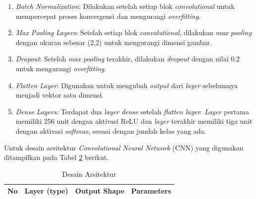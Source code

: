 \begin{table}[H]
\begin{enumerate}
        \item  \textit{Batch Normalization}: Dilakukan setelah setiap blok \textit{convolutional }untuk mempercepat proses konvergensi dan mengurangi \textit{overfitting}.
    
        \item \textit{Max Pooling Layers}: Setelah setiap blok \textit{convolutional}, dilakukan \textit{max pooling} dengan ukuran sebesar (2,2) untuk mengurangi dimensi gambar.
    
       \item  \textit{Dropout}: Setelah \textit{max pooling} terakhir, dilakukan \textit{dropout} dengan nilai 0.2 untuk mengurangi \textit{overfitting}.
    
        \item \textit{Flatten Layer}: Digunakan untuk mengubah \textit{output} dari \textit{layer} sebelumnya menjadi vektor satu dimensi.
    
        \item \textit{Dense Layers:} Terdapat dua \textit{layer dense} setelah \textit{flatten layer}. \textit{Layer} pertama memiliki 256 unit dengan aktivasi ReLU dan \textit{layer} terakhir memiliki tiga unit dengan aktivasi \textit{softmax}, sesuai dengan jumlah kelas yang ada.

    \end{enumerate}

    Untuk desain arsitektur \textit{Convolutional Neural Network} (CNN) yang digunakan ditampilkan pada Tabel 
    \ref{Desain arsitektur} berikut.

    

    \begin{table}[H]
        \centering
        \scriptsize
        \caption{Desain Arsitektur}
        \label{Desain arsitektur}
        \renewcommand{\arraystretch}{1.5}
        \begin{tabular}{p{1cm}p{4.5cm}p{4cm}p{2.5cm}}
        \hline
        \textbf{No} & \textbf{Layer (type)}   & \textbf{Output Shape} & \textbf{Parameters}  \\ \hline
        

\end{tabular}
\end{table}
\end{table}
